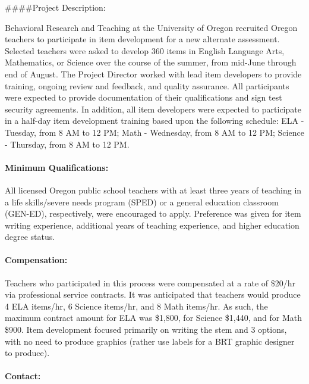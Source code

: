 \documentclass[]{article}
\let\oldparagraph\paragraph
\renewcommand{\paragraph}[1]{\oldparagraph{#1}\mbox{}}
\begin{document}
\#\#\#\#Project Description:

Behavioral Research and Teaching at the University of Oregon recruited
Oregon teachers to participate in item development for a new alternate
assessment. Selected teachers were asked to develop 360 items in English
Language Arts, Mathematics, or Science over the course of the summer,
from mid-June through end of August. The Project Director worked with
lead item developers to provide training, ongoing review and feedback,
and quality assurance. All participants were expected to provide
documentation of their qualifications and sign test security agreements.
In addition, all item developers were expected to participate in a
half-day item development training based upon the following schedule:
ELA - Tuesday, from 8 AM to 12 PM; Math - Wednesday, from 8 AM to 12 PM;
Science - Thursday, from 8 AM to 12 PM.

\hypertarget{minimum-qualifications}{%
\paragraph{Minimum Qualifications:}\label{minimum-qualifications}}

All licensed Oregon public school teachers with at least three years of
teaching in a life skills/severe needs program (SPED) or a general
education classroom (GEN-ED), respectively, were encouraged to apply.
Preference was given for item writing experience, additional years of
teaching experience, and higher education degree status.

\hypertarget{compensation}{%
\paragraph{Compensation:}\label{compensation}}

Teachers who participated in this process were compensated at a rate of
\$20/hr via professional service contracts. It was anticipated that
teachers would produce 4 ELA items/hr, 6 Science items/hr, and 8 Math
items/hr. As such, the maximum contract amount for ELA was \$1,800, for
Science \$1,440, and for Math \$900. Item development focused primarily
on writing the stem and 3 options, with no need to produce graphics
(rather use labels for a BRT graphic designer to produce).

\hypertarget{contact}{%
\paragraph{Contact:}\label{contact}}
\end{document}

